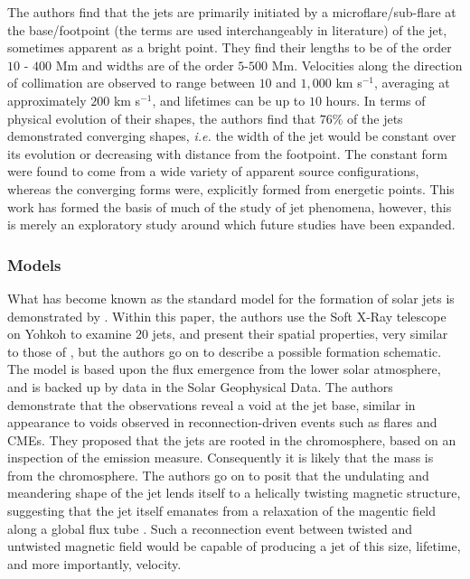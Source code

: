 The authors find that the jets are primarily initiated by a microflare/sub-flare at the base/footpoint (the terms are used interchangeably in literature) of the jet, sometimes apparent as a bright point.
They find their lengths to be of the order $10$ - $400$ Mm and widths are of the order $5$-$500$ Mm.
Velocities along the direction of collimation are observed to range between $10$ and $1,000$ km s$^{-1}$, averaging at approximately $200$ km s$^{-1}$, and lifetimes can be up to $10$ hours.
In terms of physical evolution of their shapes, the authors find that $76\%$ of the jets demonstrated converging shapes, \emph{i.e.} the width of the jet would be constant over its evolution or decreasing with distance from the footpoint. 
The constant form were found to come from a wide variety of apparent source configurations, whereas the converging forms were, explicitly formed from energetic points.
This work has formed the basis of much of the study of jet phenomena, however, this is merely an exploratory study around which future studies have been expanded.

\subsubsection{Models}
What has become known as the standard model for the formation of solar jets is demonstrated  by \cite{Shibata1992}.
Within this paper, the authors use the Soft X-Ray telescope on Yohkoh to examine $20$ jets, and present their spatial properties, very similar to those of \cite{Shimojo1996}, but the authors go on to describe a possible formation schematic.
The model is based upon the flux emergence from the lower solar atmosphere, and is backed up by data in the Solar Geophysical Data.
The authors demonstrate that the observations reveal a void at the jet base, similar in appearance to voids observed in reconnection-driven events such as flares and CMEs.
They proposed that the jets are rooted in the chromosphere, based on an inspection of the emission measure.
Consequently it is likely that the mass is from the chromosphere.
The authors go on to posit that the undulating and meandering shape of the jet lends itself to a helically twisting magnetic structure, suggesting that the jet itself emanates from a relaxation of the magentic field along a global flux tube \cite{Shibata1986}.
Such a reconnection event between twisted and untwisted magnetic field would be capable of producing a jet of this size, lifetime, and more importantly, velocity.

